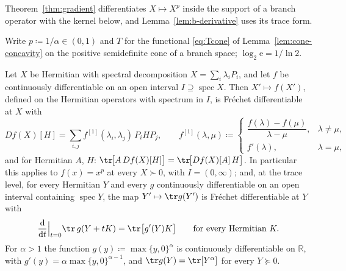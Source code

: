 
Theorem~\ref{thm:gradient} differentiates $X\mapsto X^{p}$ inside the
support of a branch operator with the kernel below, and
Lemma~\ref{lem:b-derivative} uses its trace form.

\begin{lemma}\label{lem:dk}
Write $p\coloneqq1/\alpha\in(0,1)$ and $T$ for the functional
\eqref{eq:Tcone} of Lemma~\ref{lem:cone-concavity} on the positive
semidefinite cone of a branch space; $\log_2\mathrm{e}=1/\ln2$.

Let $X$ be Hermitian with spectral decomposition $X=\sum_i\lambda_iP_i$, and
let $f$ be continuously differentiable on an open interval
$I\supseteq\operatorname{spec}X$. Then $X'\mapsto f(X')$, defined on the
Hermitian operators with spectrum in $I$, is Fr\'echet differentiable at $X$
with
\begin{equation}\label{eq:dk}
  Df(X)[H]=\sum_{i,j}f^{[1]}(\lambda_i,\lambda_j)\,P_iHP_j,
  \qquad
  f^{[1]}(\lambda,\mu)\coloneqq
  \begin{cases}\dfrac{f(\lambda)-f(\mu)}{\lambda-\mu},&\lambda\ne\mu,\\[1ex]
  f'(\lambda),&\lambda=\mu,\end{cases}
\end{equation}
and for Hermitian $A$, $H$:
$\tr\!\big[A\,Df(X)[H]\big]=\tr\!\big[Df(X)[A]\,H\big]$. In particular
this applies to $f(x)=x^{p}$ at every $X\succ0$, with $I=(0,\infty)$; and,
at the trace level, for every Hermitian $Y$ and every $g$ continuously
differentiable on an open interval containing $\operatorname{spec}Y$, the
map $Y'\mapsto\tr g(Y')$ is Fr\'echet differentiable at $Y$ with
\begin{equation}\label{eq:trace-diff}
  \frac{\mathrm d}{\mathrm dt}\Big|_{t=0}\tr\,g(Y+tK)=\tr\big[g'(Y)K\big]
  \qquad\text{for every Hermitian }K.
\end{equation}
For $\alpha>1$ the function $g(y)\coloneqq\max\{y,0\}^{\alpha}$ is
continuously differentiable on $\mathbb{R}$, with
$g'(y)=\alpha\max\{y,0\}^{\alpha-1}$, and $\tr g(Y)=\tr[Y^{\alpha}]$ for
every $Y\succeq0$.
\end{lemma}

